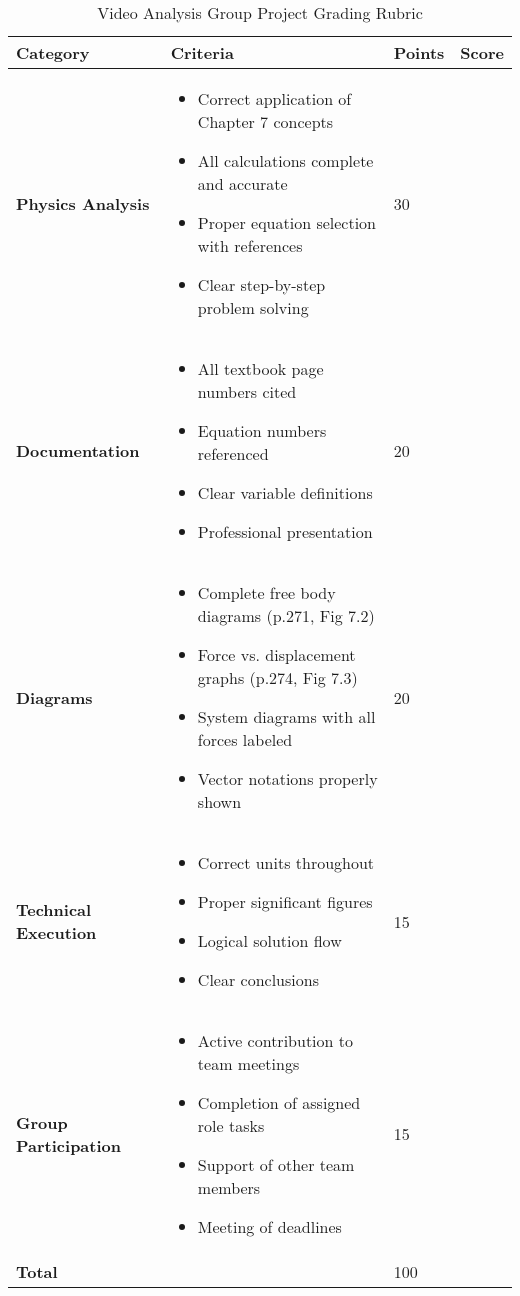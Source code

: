 \documentclass[12pt]{article}
\begin{document}
\begin{table}[h]
\centering
\begin{tabular}{|p{3cm}|p{8cm}|p{2cm}|p{2cm}|}
\hline
\textbf{Category} & \textbf{Criteria} & \textbf{Points} & \textbf{Score} \\
\hline
\textbf{Physics Analysis} & 
\begin{itemize}[leftmargin=*]
\item Correct application of Chapter 7 concepts
\item All calculations complete and accurate
\item Proper equation selection with references
\item Clear step-by-step problem solving
\end{itemize} & 30 & \\
\hline
\textbf{Documentation} & 
\begin{itemize}[leftmargin=*]
\item All textbook page numbers cited
\item Equation numbers referenced
\item Clear variable definitions
\item Professional presentation
\end{itemize} & 20 & \\
\hline
\textbf{Diagrams} & 
\begin{itemize}[leftmargin=*]
\item Complete free body diagrams (p.271, Fig 7.2)
\item Force vs. displacement graphs (p.274, Fig 7.3)
\item System diagrams with all forces labeled
\item Vector notations properly shown
\end{itemize} & 20 & \\
\hline
\textbf{Technical Execution} & 
\begin{itemize}[leftmargin=*]
\item Correct units throughout
\item Proper significant figures
\item Logical solution flow
\item Clear conclusions
\end{itemize} & 15 & \\
\hline
\textbf{Group Participation} & 
\begin{itemize}[leftmargin=*]
\item Active contribution to team meetings
\item Completion of assigned role tasks
\item Support of other team members
\item Meeting of deadlines
\end{itemize} & 15 & \\
\hline
\textbf{Total} & & 100 & \\
\hline
\end{tabular}
\caption{Video Analysis Group Project Grading Rubric}
\end{table}
\end{document}
